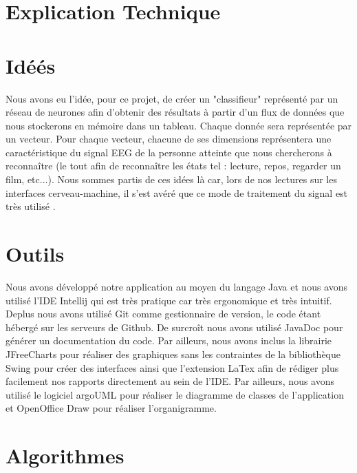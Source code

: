 
	\section{Explication Technique} %
	\label{sec:explication_technique}
		
		\section{Idéés} %
		\label{sec:idees}

		
		Nous avons eu l'idée, pour ce projet, de créer un "classifieur" représenté par un réseau de neurones afin d'obtenir des résultats à partir d'un flux de données que nous stockerons en mémoire dans un tableau. Chaque donnée sera représentée par un vecteur. Pour chaque vecteur, chacune de ses dimensions représentera une caractéristique du signal EEG de la personne atteinte que nous chercherons à reconnaître (le tout afin de reconnaître les états tel : lecture, repos, regarder un film, etc...). Nous sommes partis de ces idées là car, lors de nos lectures sur les interfaces cerveau-machine, il s'est avéré que ce mode de traitement du signal est très utilisé .
		
		\section{Outils} %
		\label{sec:outils}
		
		Nous avons développé notre application au moyen du langage Java et nous avons utilisé l'IDE Intellij qui est très pratique car très ergonomique et très intuitif. 
		Deplus nous avons utilisé Git comme gestionnaire de version, le code étant hébergé sur les serveurs de Github. De surcroît nous avons utilisé JavaDoc pour générer un documentation du code.
		Par ailleurs, nous avons inclus la librairie JFreeCharts pour réaliser des graphiques sans les contraintes de la bibliothèque Swing pour créer des interfaces ainsi que l'extension LaTex afin de rédiger plus facilement nos rapports directement au sein de l'IDE.
		Par ailleurs, nous avons utilisé le logiciel argoUML pour réaliser le diagramme de classes de l'application et OpenOffice Draw pour réaliser l'organigramme.
		
		\section{Algorithmes} %
		\label{sec:algorithmes}
		
